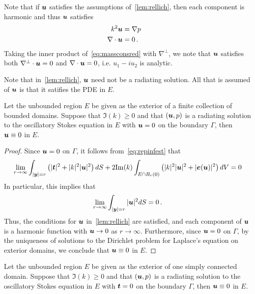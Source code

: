 \begin{remark} \label{rmk:harmu}
  Note that if ${\boldsymbol u}$ satisfies the assumptions
  of~\cref{lem:rellich}, then each component is harmonic
  and thus ${\boldsymbol u}$ satisfies
\begin{align}
k^2 {\boldsymbol u} &= \nabla p  \quad \label{eq:massconsred} \\
\nabla \cdot {\boldsymbol u} &= 0 \, . \nonumber
\end{align}
Taking the inner product of~\cref{eq:massconsred} with $\nabla^{\perp}$,
we note that ${\boldsymbol u}$ satisfies both $\nabla^{\perp} \cdot {\boldsymbol u} = 0$ 
and $\nabla \cdot {\boldsymbol u} = 0$, i.e. $u_1 - i u_2$ is analytic.
\end{remark}
\begin{remark}
Note that in~\cref{lem:rellich}, ${\boldsymbol u}$ need not be a radiating solution. 
All that is assumed of ${\boldsymbol u}$ is that it satifies the PDE in $E$.
\end{remark}

\begin{thrm}
  Let the unbounded region $E$ be given as the exterior
  of a finite collection of bounded domains.
  Suppose that $\Im(k)\geq 0$ and 
  that $({\boldsymbol u},p)$ is a radiating solution to the oscillatory Stokes
  equation in $E$ with ${\boldsymbol u} =0$ on the boundary $\Gamma$, then
  ${\boldsymbol u} \equiv 0$ in $E$.
\end{thrm}

\begin{proof}
Since ${\boldsymbol u} = 0$ on $\Gamma$, it follows from~\cref{eq:repinfest} that
\begin{equation}
\lim_{r\to\infty}
\int_{|{\boldsymbol y}|=r} \left( |{\boldsymbol t}|^2 + |k|^2 |{\boldsymbol u}|^2 \right) dS +
2 {\textrm{\textup{Im}}}(k) \int_{E \cap B_{r}(0)} \left(|k|^2 |{\boldsymbol u}|^2 + |{\boldsymbol e}({\boldsymbol u})|^2 \right)
dV = 0 \nonumber
\end{equation} 
In particular, this implies that
\begin{equation}
\lim_{r\to\infty} \int_{|{\boldsymbol y}|=r} |{\boldsymbol u}|^2 dS = 0 \, . \nonumber
\end{equation}
Thus, the conditions for ${\boldsymbol u}$ in~\cref{lem:rellich}
are satisfied, and each component of ${\boldsymbol u}$ is a harmonic function
with ${\boldsymbol u} \to 0$ as $r \to \infty$. Furthermore, since ${\boldsymbol u}=0$ on
$\Gamma$, by the uniqueness of solutions to the
Dirichlet problem for Laplace's equation
on exterior domains, we conclude that ${\boldsymbol u} \equiv 0$ in $E$.
\end{proof}

\begin{thrm}
  Let the unbounded region $E$ be given as the exterior
  of one simply connected domain.
  Suppose that $\Im(k)\geq 0$ and 
  that $({\boldsymbol u},p)$ is a radiating solution to the oscillatory Stokes
  equation in $E$ with ${\boldsymbol t} = 0$ on the boundary $\Gamma$, then
  ${\boldsymbol u} \equiv 0$ in $E$.
\end{thrm}

